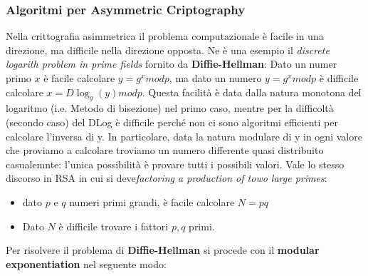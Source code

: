 \documentclass{article}
\theoremstyle{remark}
\begin{document}
\subsubsection{Algoritmi per Asymmetric Criptography}
Nella crittografia asimmetrica il problema computazionale è facile in una direzione, ma difficile nella direzione opposta. Ne è una esempio il \emph{discrete logarith problem in prime fields} fornito da \textbf{Diffie-Hellman}: Dato un numer primo \(x\) è facile calcolare \(y=g^x mod p\), ma dato un numero \(y=g^x mod p\) è difficile calcolare \(x=D\log_{g}(y) mod p\). Questa facilità è data dalla natura monotona del logaritmo (i.e. Metodo di bisezione) nel primo caso, mentre per la difficoltà (secondo caso) del DLog è difficile perché non ci sono algoritmi efficienti per calcolare l'inversa di y. In particolare, data la natura modulare di y in ogni valore che proviamo a calcolare troviamo un numero differente quasi distribuito casualemnte: l'unica possibilità è provare tutti i possibili valori.\newline 
Vale lo stesso discorso in RSA in cui si deve\emph{factoring a production of towo large primes}:\begin{itemize}
	\item dato \(p\) e \(q\) numeri primi grandi, è facile calcolare \(N=pq\)
	\item Dato \(N\) è difficile trovare i fattori \(p,q\) primi.
\end{itemize}
Per risolvere il problema di \textbf{Diffie-Hellman} si procede con il \textbf{modular exponentiation} nel seguente modo:
\end{document}
